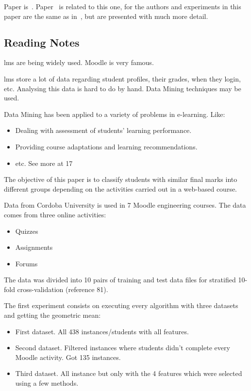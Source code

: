 Paper is~\cite{ind_003}. Paper~\cite{ind_007} is related to this one, for the
authors and experiments in this paper are the same as in~\cite{ind_007}, but
are presented with much more detail.

\subsection{Reading Notes}

\Gls{lms} are being widely used. Moodle is very famous.

\Gls{lms} store a lot of data regarding student profiles, their grades, when
they login, etc. Analysing this data is hard to do by hand. Data Mining
techniques may be used.

Data Mining has been applied to a variety of problems in e-learning. Like:

\begin{itemize}
    \item Dealing with assessment of students' learning performance.
    \item Providing course adaptations and learning recommendations.
    \item etc. See more at 17
\end{itemize}

The objective of this paper is to classify students with similar final marks
into different groups depending on the activities carried out in a web-based
course.

Data from Cordoba University is used in 7 Moodle engineering courses. The data
comes from three online activities:

\begin{itemize}
    \item Quizzes
    \item Assignments
    \item Forums
\end{itemize}

The data was divided into 10 pairs of training and test data files for
stratified 10-fold cross-validation (reference 81).

The first experiment consists on executing every algorithm with three datasets
and getting the geometric mean:

\begin{itemize}
    \item First dataset. All 438 instances/students with all features.
    \item Second dataset. Filtered instances where students didn't complete
        every Moodle activity. Got 135 instances.
    \item Third dataset. All instance but only with the 4 features which were
        selected using a few methods.
\end{itemize}

